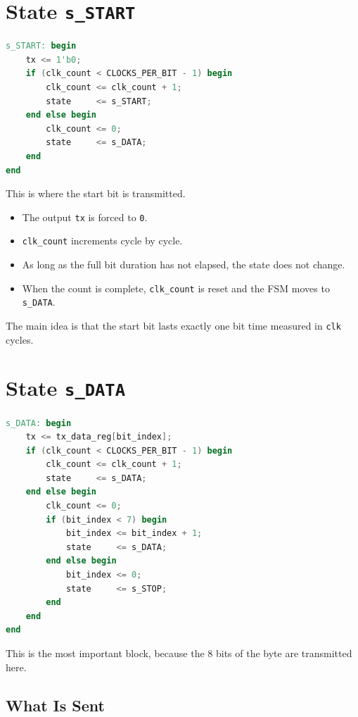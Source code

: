 \documentclass[12pt]{article}
\begin{document}
\section{State \texttt{s\_START}}

\begin{lstlisting}[language=Verilog]
s_START: begin
    tx <= 1'b0;
    if (clk_count < CLOCKS_PER_BIT - 1) begin
        clk_count <= clk_count + 1;
        state     <= s_START;
    end else begin
        clk_count <= 0;
        state     <= s_DATA;
    end
end
\end{lstlisting}

This is where the start bit is transmitted.

\begin{itemize}
    \item The output \texttt{tx} is forced to \texttt{0}.
    \item \texttt{clk\_count} increments cycle by cycle.
    \item As long as the full bit duration has not elapsed, the state does not change.
    \item When the count is complete, \texttt{clk\_count} is reset and the FSM moves to \texttt{s\_DATA}.
\end{itemize}

The main idea is that the start bit lasts exactly one bit time measured in \texttt{clk} cycles.

\section{State \texttt{s\_DATA}}

\begin{lstlisting}[language=Verilog]
s_DATA: begin
    tx <= tx_data_reg[bit_index];
    if (clk_count < CLOCKS_PER_BIT - 1) begin
        clk_count <= clk_count + 1;
        state     <= s_DATA;
    end else begin
        clk_count <= 0;
        if (bit_index < 7) begin
            bit_index <= bit_index + 1;
            state     <= s_DATA;
        end else begin
            bit_index <= 0;
            state     <= s_STOP;
        end
    end
end
\end{lstlisting}

This is the most important block, because the 8 bits of the byte are transmitted here.

\subsection*{What Is Sent}
\end{document}
